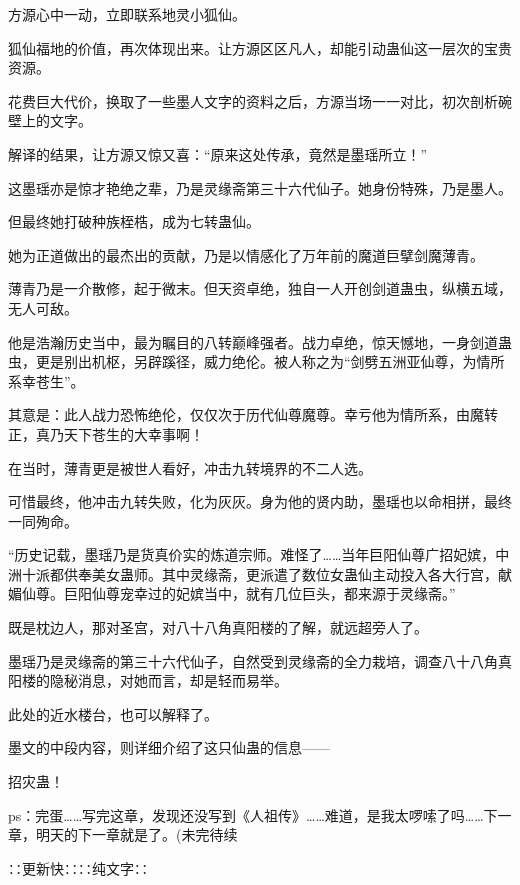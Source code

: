 \begin{this_body}
方源心中一动，立即联系地灵小狐仙。

狐仙福地的价值，再次体现出来。让方源区区凡人，却能引动蛊仙这一层次的宝贵资源。

花费巨大代价，换取了一些墨人文字的资料之后，方源当场一一对比，初次剖析碗壁上的文字。

解译的结果，让方源又惊又喜：“原来这处传承，竟然是墨瑶所立！”

这墨瑶亦是惊才艳绝之辈，乃是灵缘斋第三十六代仙子。她身份特殊，乃是墨人。

但最终她打破种族桎梏，成为七转蛊仙。

她为正道做出的最杰出的贡献，乃是以情感化了万年前的魔道巨擘剑魔薄青。

薄青乃是一介散修，起于微末。但天资卓绝，独自一人开创剑道蛊虫，纵横五域，无人可敌。

他是浩瀚历史当中，最为瞩目的八转巅峰强者。战力卓绝，惊天憾地，一身剑道蛊虫，更是别出机枢，另辟蹊径，威力绝伦。被人称之为“剑劈五洲亚仙尊，为情所系幸苍生”。

其意是：此人战力恐怖绝伦，仅仅次于历代仙尊魔尊。幸亏他为情所系，由魔转正，真乃天下苍生的大幸事啊！

在当时，薄青更是被世人看好，冲击九转境界的不二人选。

可惜最终，他冲击九转失败，化为灰灰。身为他的贤内助，墨瑶也以命相拼，最终一同殉命。

“历史记载，墨瑶乃是货真价实的炼道宗师。难怪了……当年巨阳仙尊广招妃嫔，中洲十派都供奉美女蛊师。其中灵缘斋，更派遣了数位女蛊仙主动投入各大行宫，献媚仙尊。巨阳仙尊宠幸过的妃嫔当中，就有几位巨头，都来源于灵缘斋。”

既是枕边人，那对圣宫，对八十八角真阳楼的了解，就远超旁人了。

墨瑶乃是灵缘斋的第三十六代仙子，自然受到灵缘斋的全力栽培，调查八十八角真阳楼的隐秘消息，对她而言，却是轻而易举。

此处的近水楼台，也可以解释了。

墨文的中段内容，则详细介绍了这只仙蛊的信息——

招灾蛊！

ps：完蛋……写完这章，发现还没写到《人祖传》……难道，是我太啰嗦了吗……下一章，明天的下一章就是了。(未完待续

∷更新快∷∷纯文字∷

\end{this_body}

